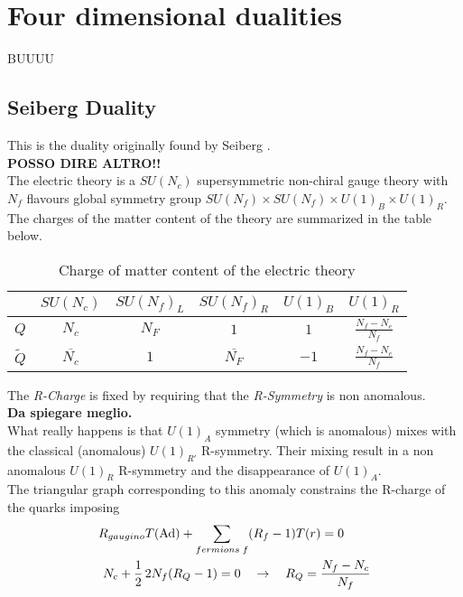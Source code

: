 
\section{Four dimensional dualities}
\begin{comment}
 Roba da dire nel capitolo:
 ~ Phases of gauge theories?(asympt. free, non abeliam coulomb/magnetic ecc)
 ~ Region where duality is correct because of unitary?
 ~Use of superconformal algebra
 ~Anomaly free global symmetries
 ~Different gauge group : no problem, scale invariant theory
 ~ Construct the dual from gauge invariant operators: they make sense and are consistent with other symmetries & anomalies
 ~Superpotential allowed by charges
 ~'t'Hooft anomalies
 ~Different group con be used
\end{comment}

BUUUU
\subsection*{Seiberg Duality}
This is the duality originally found by Seiberg \cite{Seiberg:1994pq}.\\
\textbf{POSSO DIRE ALTRO!!}\\
The electric theory is a $SU(N_c) $ supersymmetric non-chiral gauge theory with $N_f$ flavours global symmetry group $SU(N_f) \times SU(N_f) \times U(1)_B \times U(1)_R $. The charges of the matter content of the theory are summarized in the table below.

\begin{table}[h!]
 \begin{tabular}{c | c |  c c c c }
 & $SU(N_c) $& $SU(N_f)_L$  &$SU(N_f)_R $  & $U(1)_B$ &  $U(1)_R$ \\
\hline
$Q$ & $N_c$ & $N_F$ & $1$   &  $1$  & $ \frac{N_f - N_c}{N_f}$  \\
$\tilde{Q}$ &$\overline{N_c} $ &  $1$ & $\overline{ N_F}$   & $-1$   &  $\frac{N_f - N_c}{N_f}$   \\	 
 \end{tabular}
	\centering
 \caption{Charge of matter content of the electric theory}
\end{table}
The \emph{R-Charge} is fixed by requiring that the \emph{R-Symmetry} is non anomalous. \\
\textbf{Da spiegare meglio.}\\
What really happens is that $U(1)_A$ symmetry (which is anomalous) mixes with the classical (anomalous) $U(1)_{R'}$ R-symmetry. Their mixing result in a non anomalous $U(1)_R$ R-symmetry and the disappearance of $U(1)_A$.\\ The triangular graph corresponding to this anomaly constrains the R-charge of the quarks imposing
\begin{align*}
R_{gaugino} T (\hbox{Ad}) + \sum_{fermions \; f} (& R_{f} - 1)  T(r)   = 0 \\
N_c + \frac{1}{2}\,  2 N_f (R_Q -1)  = 0 \quad & \rightarrow \quad R_Q = \frac{N_f - N_c}{N_f}
\end{align*}

